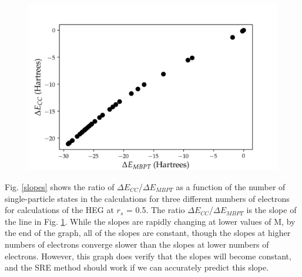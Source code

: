 \begin{figure}
    \includegraphics[scale=0.75]{Images/Chapter7/ElectronGas/MBPT_vs_CC.png}
    \label{mbpt_vs_cc}
\end{figure}

Fig. \ref{slopes} shows the ratio of $\Delta E_{CC}$/$\Delta E_{MBPT}$ as a function of the number of single-particle states in the calculations for three different numbers of electrons for calculations of the HEG at $r_s$ = 0.5. The ratio $\Delta E_{CC}$/$\Delta E_{MBPT}$ is the slope of the line in Fig. \ref{mbpt_vs_cc}. While the slopes are rapidly changing at lower values of M, by the end of the graph, all of the slopes are constant, though the slopes at higher numbers of electrons converge slower than the slopes at lower numbers of electrons. However, this graph does verify that the slopes will become constant, and the SRE method should work if we can accurately predict this slope.

